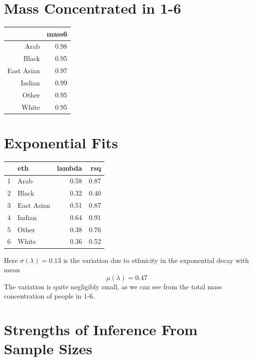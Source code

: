\documentclass{amsart}
\begin{document}
\section{Mass Concentrated in 1-6}

\begin{table}[ht]
\centering
\begin{tabular}{rr}
  \hline
 & mass6 \\ 
  \hline
Arab & 0.98 \\ 
  Black & 0.95 \\ 
  East Asian & 0.97 \\ 
  Indian & 0.99 \\ 
  Other & 0.95 \\ 
  White & 0.95 \\ 
   \hline
\end{tabular}
\end{table}

\section{Exponential Fits}

\begin{table}[ht]
\centering
\begin{tabular}{rlrr}
  \hline
 & eth & lambda & rsq \\ 
  \hline
1 & Arab & 0.58 & 0.87 \\ 
  2 & Black & 0.32 & 0.40 \\ 
  3 & East Asian & 0.51 & 0.87 \\ 
  4 & Indian & 0.64 & 0.91 \\ 
  5 & Other & 0.38 & 0.76 \\ 
  6 & White & 0.36 & 0.52 \\ 
   \hline
\end{tabular}
\end{table}

Here $\sigma(\lambda)=0.13
$ is the variation due to ethnicity in the exponential decay with mean 
\[
\mu(\lambda)=0.47
\]
The variation is quite negligibly small, as we can see from the total mass concentration of people in 1-6.

\section{Strengths of Inference From Sample Sizes}
\end{document}
